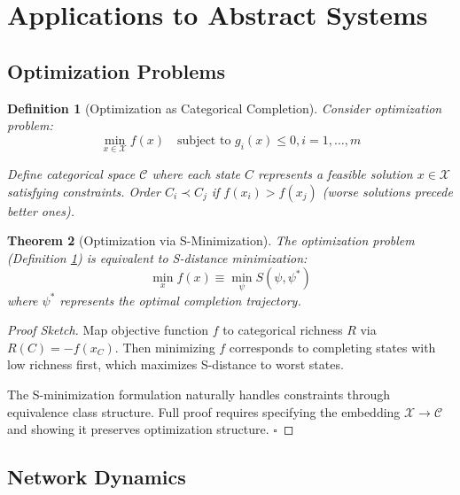 \documentclass[12pt,a4paper]{article}
\newtheorem{theorem}{Theorem}[section]
\newtheorem{definition}[theorem]{Definition}
\begin{document}
\section{Applications to Abstract Systems}

\subsection{Optimization Problems}

\begin{definition}[Optimization as Categorical Completion]
\label{def:optimization_categorical}
Consider optimization problem:
\begin{equation}
\min_{x \in \mathcal{X}} f(x) \quad \text{subject to } g_i(x) \leq 0, i = 1, \ldots, m
\end{equation}

Define categorical space $\mathcal{C}$ where each state $C$ represents a feasible solution $x \in \mathcal{X}$ satisfying constraints. Order $C_i \prec C_j$ if $f(x_i) > f(x_j)$ (worse solutions precede better ones).
\end{definition}

\begin{theorem}[Optimization via S-Minimization]
\label{thm:optimization_s}
The optimization problem (Definition \ref{def:optimization_categorical}) is equivalent to S-distance minimization:
\begin{equation}
\min_{x} f(x) \equiv \min_{\psi} S(\psi, \psi^*)
\end{equation}
where $\psi^*$ represents the optimal completion trajectory.
\end{theorem}

\begin{proof}[Proof Sketch]
Map objective function $f$ to categorical richness $R$ via $R(C) = -f(x_C)$. Then minimizing $f$ corresponds to completing states with low richness first, which maximizes S-distance to worst states.

The S-minimization formulation naturally handles constraints through equivalence class structure. Full proof requires specifying the embedding $\mathcal{X} \to \mathcal{C}$ and showing it preserves optimization structure. $\square$
\end{proof}

\subsection{Network Dynamics}
\end{document}
